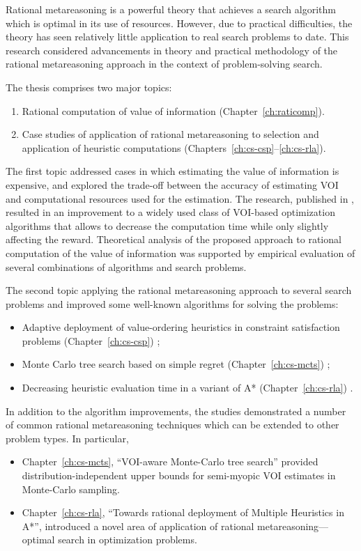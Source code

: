 Rational metareasoning is a powerful theory that achieves a search
algorithm which is optimal in its use of resources. However, due to
practical difficulties, the theory has seen relatively little
application to real search problems to date. This research considered
advancements in theory and practical methodology of the rational
metareasoning approach in the context of problem-solving search.

The thesis comprises two major topics:
\begin {enumerate}
\item Rational computation of value of information (Chapter~\ref{ch:raticomp}).
\item Case studies of application of rational metareasoning to
  selection and application of heuristic computations
  (Chapters~\ref{ch:cs-csp}--\ref{ch:cs-rla}). 
\end {enumerate}

The first topic addressed cases in which estimating the value of
information is expensive, and explored the trade-off between the
accuracy of estimating VOI and computational resources used for the
estimation. The research, published in \cite{TolpinShimony.raticomp},
resulted in an improvement to a widely used class of VOI-based
optimization algorithms that allows to decrease the computation time
while only slightly affecting the reward. Theoretical analysis of the
proposed approach to rational computation of the value of information
was supported by empirical evaluation of several combinations of
algorithms and search problems.

The second topic applying the rational metareasoning approach to
several search problems and improved some well-known algorithms for
solving the problems: 
\begin {itemize}
\item Adaptive deployment of value-ordering heuristics in constraint
  satisfaction problems (Chapter~\ref{ch:cs-csp}) \cite{TolpinShimony.csp};
\item Monte Carlo tree search based on simple regret
  (Chapter~\ref{ch:cs-mcts})
  \cite{TolpinShimony.mcts,HayRussellTolpinShimony.selecting}; 
\item Decreasing heuristic evaluation time in a variant of A*
  (Chapter~\ref{ch:cs-rla}) \cite{TolpinEtAl.rla}. 
\end {itemize}
In addition to the algorithm improvements, the studies demonstrated a
number of common rational metareasoning techniques which can be 
extended to other problem types. In particular,
\begin{itemize}
\item Chapter~\ref{ch:cs-mcts}, ``VOI-aware Monte-Carlo tree search''
provided distribution-independent upper bounds for semi-myopic VOI
estimates in Monte-Carlo sampling.
\item Chapter~\ref{ch:cs-rla}, ``Towards rational deployment of Multiple
Heuristics in A*'', introduced a novel area of application of rational
metareasoning---optimal search in optimization problems.
\end{itemize}

